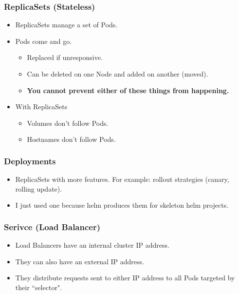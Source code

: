     \begin{frame}
        \frametitle{ReplicaSets (Stateless)}
        \begin{itemize}
            \item ReplicaSets manage a set of Pods.\pause
            \item Pods come and go.\pause
            \begin{itemize}
                \item Replaced if unresponsive.\pause
                \item Can be deleted on one Node and added on another (moved).\pause
                \item \textbf{You cannot prevent either of these things from happening.}\pause
            \end{itemize}
            \item With ReplicaSets\pause
            \begin{itemize}
                \item Volumes don't follow Pods.\pause
                \item Hostnames don't follow Pods.
            \end{itemize}
        \end{itemize}
    \end{frame}

    \begin{frame}
        \frametitle{Deployments}
        \begin{itemize}
            \item ReplicaSets with more features. For example: rollout strategies (canary, rolling update).\pause
            \item I just used one because helm produces them for skeleton helm projects.
        \end{itemize}
    \end{frame}

    \begin{frame}
        \frametitle{Serivce (Load Balancer)}
        \begin{itemize}
            \item Load Balancers have an internal cluster IP address.\pause
            \item They can also have an external IP address.\pause
            \item They distribute requests sent to either IP address to all Pods targeted by their ``selector".
        \end{itemize}
    \end{frame}

